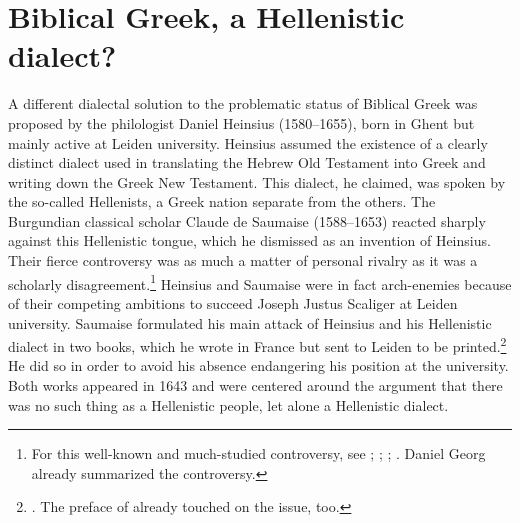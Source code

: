 \section{Biblical Greek, a Hellenistic dialect?}\label{sec:4.6}

A different dialectal solution to the problematic status of Biblical Greek was proposed by the philologist Daniel Heinsius (1580–1655), born in Ghent but mainly active at Leiden university. Heinsius assumed the existence of a clearly distinct dialect used in translating the Hebrew Old Testament into Greek and writing down the Greek New Testament. This dialect, he claimed, was spoken by the so-called Hellenists, a Greek nation separate from the others. The Burgundian classical scholar Claude de Saumaise (1588–1653) reacted sharply against this Hellenistic tongue, which he dismissed as an invention of Heinsius. Their fierce controversy was as much a matter of personal rivalry as it was a scholarly disagreement.\footnote{For this well-known and much-studied controversy, see ; \citet[391--392]{Muller1984}; \citet{Considine2010}; \citet[350--351]{VanHal2010a}. Daniel Georg \citet[\textsc{ii.}74–77]{Morhof1708} already summarized the controversy.} Heinsius and Saumaise were in fact arch-enemies because of their competing ambitions to succeed Joseph Justus Scaliger at Leiden university. Saumaise formulated his main attack of Heinsius and his Hellenistic dialect in two books, which he wrote in France but sent to Leiden to be printed.\footnote{\citet[]{Saumaise1643a, Saumaise1643}. The preface of \citet{Saumaise1639} already touched on the issue, too.} He did so in order to avoid his absence endangering his position at the university. Both works appeared in 1643 and were centered around the argument that there was no such thing as a Hellenistic people, let alone a Hellenistic dialect.


